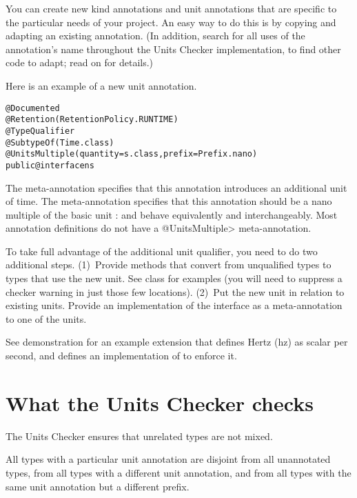 You can create new kind annotations and unit annotations that are specific
to the particular needs of your project.  An easy way to do this is by
copying and adapting an existing annotation.  (In addition, search for all
uses of the annotation's name throughout the Units Checker implementation,
to find other code to adapt; read on for details.)

Here is an example of a new unit annotation.

\begin{alltt}
@Documented
@Retention(RetentionPolicy.RUNTIME)
@TypeQualifier
@SubtypeOf( \ttlcb{} Time.class \ttrcb{} )
@UnitsMultiple(quantity=s.class, prefix=Prefix.nano)
public @interface ns \ttlcb{}\ttrcb{}
\end{alltt}

The  meta-annotation specifies that this annotation
introduces an additional unit of time.
The  meta-annotation specifies that this annotation
should be a nano multiple of the basic unit :   and
behave equivalently and interchangeably.
Most annotation definitions do not have a \<@UnitsMultiple> meta-annotation.


To take full advantage of the additional unit qualifier, you need to
do two additional steps.
(1)~Provide methods that convert from unqualified types to types that use
the new unit.  
See class  for examples (you will need to suppress a
checker warning in just those few locations).
(2)~Put the new unit in relation to existing units.
Provide an
implementation of the  interface as a
meta-annotation to one of the units.

See demonstration  for an example
extension that defines Hertz (hz) as scalar per second, and defines an
implementation of  to enforce it.



\section{What the Units Checker checks\label{units-checks}}

The Units Checker ensures that unrelated types are not mixed. 

All types with a particular unit annotation are
disjoint from all unannotated types, from all types with a different unit
annotation, and from all types with the same unit annotation but a
different prefix.

